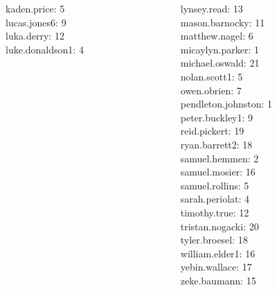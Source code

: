 \documentclass[10pt]{beamer}
\begin{document}
\begin{frame}
\begin{columns}
\begin{column}{0.33\textwidth}
kaden.price: 5 \\ 
lucas.jones6: 9 \\ 
luka.derry: 12 \\ 
luke.donaldson1: 4 \\\end{column}
\begin{column}{0.33\textwidth}
lynsey.read: 13 \\ 
mason.barnocky: 11 \\ 
matthew.nagel: 6 \\ 
micaylyn.parker: 1 \\ 
michael.oswald: 21 \\ 
nolan.scott1: 5 \\ 
owen.obrien: 7 \\ 
pendleton.johnston: 1 \\ 
peter.buckley1: 9 \\ 
reid.pickert: 19 \\ 
ryan.barrett2: 18 \\ 
samuel.hemmen: 2 \\ 
samuel.mosier: 16 \\ 
samuel.rollins: 5 \\ 
sarah.periolat: 4 \\ 
timothy.true: 12 \\ 
tristan.nogacki: 20 \\ 
tyler.broesel: 18 \\ 
william.elder1: 16 \\ 
yebin.wallace: 17 \\ 
zeke.baumann: 15 \\\end{column}
\end{columns}
\vfill
\end{frame}
\end{document}

